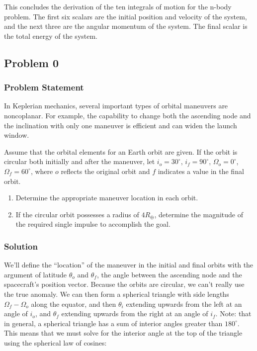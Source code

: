 This concludes the derivation of the ten integrals of motion for the n-body problem. The first six scalars are the initial position and velocity of the system, and the next three are the angular momentum of the system. The final scalar is the total energy of the system.

\subsection{Problem 0}

\subsubsection{Problem Statement}

In Keplerian mechanics, several important types of orbital maneuvers are noncoplanar. For example, the capability to change both the ascending node and the inclination with only one maneuver is efficient and can widen the launch window.

Assume that the orbital elements for an Earth orbit are given. If the orbit is circular both initially and after the maneuver, let $i_o=30^\circ$, $i_f=90^\circ$, $\Omega_o=0^\circ$, $\Omega_f=60^\circ$, where $o$ reflects the original orbit and $f$ indicates a value in the final orbit.

\begin{enumerate}
    \item Determine the appropriate maneuver location in each orbit.
    \item If the circular orbit possesses a radius of $4R_\oplus$, determine the magnitude of the required single impulse to accomplish the goal.
\end{enumerate}

\subsubsection{Solution}

We'll define the ``location'' of the maneuver in the initial and final orbits with the argument of latitude $\theta_o$ and $\theta_f$, the angle between the ascending node and the spacecraft's position vector. Because the orbits are circular, we can't really use the true anomaly. We can then form a spherical triangle with side lengths $\Omega_f - \Omega_o$ along the equator, and then $\theta_i$ extending upwards from the left at an angle of $i_o$, and $\theta_f$ extending upwards from the right at an angle of $i_f$. Note: that in general, a spherical triangle has a sum of interior angles greater than $180^\circ$. This means that we must solve for the interior angle at the top of the triangle using the spherical law of cosines:

